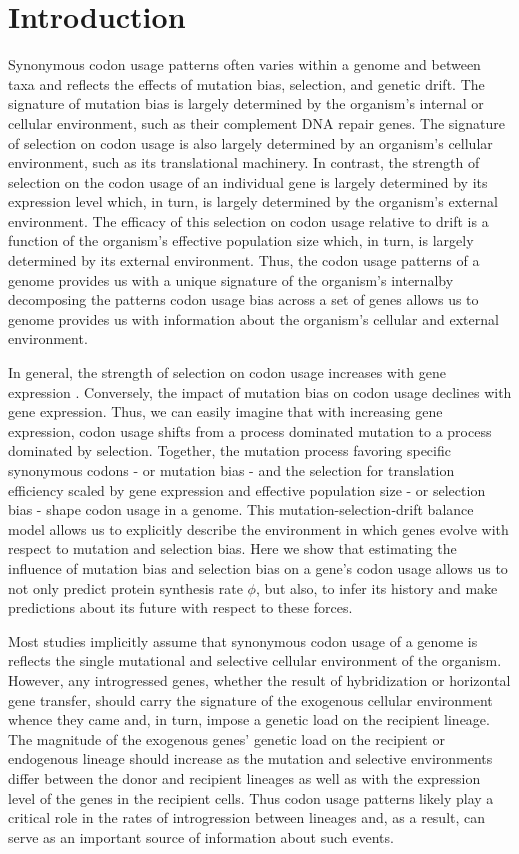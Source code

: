 \documentclass[12pt]{article}
\begin{document}
\section*{Introduction}
Synonymous codon usage patterns often varies within a genome and between taxa and reflects the effects of mutation bias, selection, and genetic drift.
The signature of mutation bias is largely determined by the organism's internal or cellular environment, such as their complement DNA repair genes.
The signature of selection on codon usage is also largely determined by an organism's cellular environment, such as its translational machinery. 
In contrast, the strength of selection on the codon usage of an individual gene is largely determined by its expression level which, in turn, is largely determined by the organism's external environment.
The efficacy of this selection on codon usage relative to drift is a function of the organism's effective population size \Ne which, in turn, is largely determined by its external environment.
Thus, the codon usage patterns of a genome provides us with a unique signature of the organism's internalby decomposing the patterns codon usage bias across a set of genes allows us to genome provides us with information about the organism's cellular and external environment.

In general, the strength of selection on codon usage increases with gene expression \citep{ikemura1985, gouy1982}.
Conversely, the impact of mutation bias on codon usage declines with gene expression.
Thus, we can easily imagine that with increasing gene expression, codon usage shifts from a process dominated mutation to a process dominated by selection.
Together, the mutation process favoring specific synonymous codons - or mutation bias -  and the selection for translation efficiency scaled by gene expression and effective population size - or selection bias -  shape codon usage in a genome.
This mutation-selection-drift balance model allows us to explicitly describe the environment in which genes evolve with respect to mutation and selection bias.
Here we show that estimating the influence of mutation bias and selection bias on a gene's codon usage allows us to not only predict protein synthesis rate $\phi$, but also, to infer its history and make predictions about its future with respect to these forces.

Most studies implicitly assume that synonymous codon usage of a genome is reflects the single mutational and selective cellular environment of the organism. 
However, any introgressed genes, whether the result of hybridization or horizontal gene transfer, should carry the signature of the exogenous cellular environment whence they came and, in turn, impose a genetic load on the recipient lineage.
The magnitude of the exogenous genes' genetic load on the recipient or endogenous lineage should increase as the mutation and selective environments differ between the donor and recipient lineages as well as with the expression level of the genes in the recipient cells.
Thus codon usage patterns likely play a critical role in the rates of introgression between lineages and, as a result, can serve as an important source of information about such events.
\end{document}
